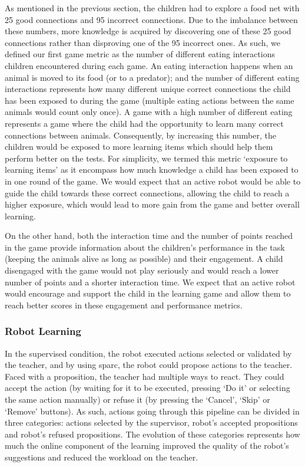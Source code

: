 As mentioned in the previous section, the children had to explore a food net with 25 good connections and 95 incorrect connections. Due to the imbalance between these numbers, more knowledge is acquired by discovering one of these 25 good connections rather than disproving one of the 95 incorrect ones. As such, we defined our first game metric as the number of different eating interactions children encountered during each game. An eating interaction happens when an animal is moved to its food (or to a predator); and the number of different eating interactions represents how many different unique correct connections the child has been exposed to during the game (multiple eating actions between the same animals would count only once). A game with a high number of different eating represents a game where the child had the opportunity to learn many correct connections between animals. Consequently, by increasing this number, the children would be exposed to more learning items which should help them perform better on the tests. For simplicity, we termed this metric `exposure to learning items' as it encompass how much knowledge a child has been exposed to in one round of the game. We would expect that an active robot would be able to guide the child towards these correct connections, allowing the child to reach a higher exposure, which would lead to more gain from the game and better overall learning.

On the other hand, both the interaction time and the number of points reached in the game provide information about the children's performance in the task (keeping the animals alive as long as possible) and their engagement. A child disengaged with the game would not play seriously and would reach a lower number of points and a shorter interaction time. We expect that an active robot would encourage and support the child in the learning game and allow them to reach better scores in these engagement and performance metrics.

\subsubsection{Robot Learning}

In the supervised condition, the robot executed actions selected or validated by the teacher, and by using \gls{sparc}, the robot could propose actions to the teacher. Faced with a proposition, the teacher had multiple ways to react. They could accept the action (by waiting for it to be executed, pressing `Do it' or selecting the same action manually) or refuse it (by pressing the `Cancel', `Skip' or `Remove' buttons). As such, actions going through this pipeline can be divided in three categories: actions selected by the supervisor, robot's accepted propositions and robot's refused propositions. The evolution of these categories represents how much the online component of the learning improved the quality of the robot's suggestions and reduced the workload on the teacher. 

